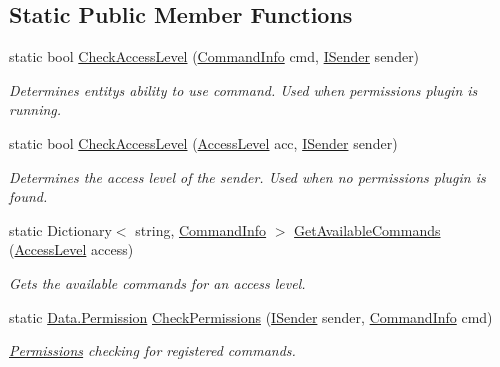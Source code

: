 \subsection*{Static Public Member Functions}
\begin{DoxyCompactItemize}
\item 
static bool \hyperlink{class_o_t_a_1_1_command_1_1_command_parser_a3e56a71a1677a3d2e2c05159a40729e1}{Check\+Access\+Level} (\hyperlink{class_o_t_a_1_1_command_1_1_command_info}{Command\+Info} cmd, \hyperlink{interface_o_t_a_1_1_command_1_1_i_sender}{I\+Sender} sender)
\begin{DoxyCompactList}\small\item\em Determines entity\textquotesingle{}s ability to use command. Used when permissions plugin is running. \end{DoxyCompactList}\item 
static bool \hyperlink{class_o_t_a_1_1_command_1_1_command_parser_a0160455b0ebde8459a0c8f385d762dee}{Check\+Access\+Level} (\hyperlink{namespace_o_t_a_1_1_command_a8b5f51579148d05d330f1911083e7a8e}{Access\+Level} acc, \hyperlink{interface_o_t_a_1_1_command_1_1_i_sender}{I\+Sender} sender)
\begin{DoxyCompactList}\small\item\em Determines the access level of the sender. Used when no permissions plugin is found. \end{DoxyCompactList}\item 
static Dictionary$<$ string, \hyperlink{class_o_t_a_1_1_command_1_1_command_info}{Command\+Info} $>$ \hyperlink{class_o_t_a_1_1_command_1_1_command_parser_a4f45730a41ca273ded63ca0c2845dd44}{Get\+Available\+Commands} (\hyperlink{namespace_o_t_a_1_1_command_a8b5f51579148d05d330f1911083e7a8e}{Access\+Level} access)
\begin{DoxyCompactList}\small\item\em Gets the available commands for an access level. \end{DoxyCompactList}\item 
static \hyperlink{namespace_o_t_a_1_1_data_acb383d9e681580b5a8710a08fb7c3aef}{Data.\+Permission} \hyperlink{class_o_t_a_1_1_command_1_1_command_parser_a9eb9f7fe1ab63ecd4ca0de2839665f5e}{Check\+Permissions} (\hyperlink{interface_o_t_a_1_1_command_1_1_i_sender}{I\+Sender} sender, \hyperlink{class_o_t_a_1_1_command_1_1_command_info}{Command\+Info} cmd)
\begin{DoxyCompactList}\small\item\em \hyperlink{namespace_o_t_a_1_1_permissions}{Permissions} checking for registered commands. \end{DoxyCompactList}\item 

\end{DoxyCompactItemize}
